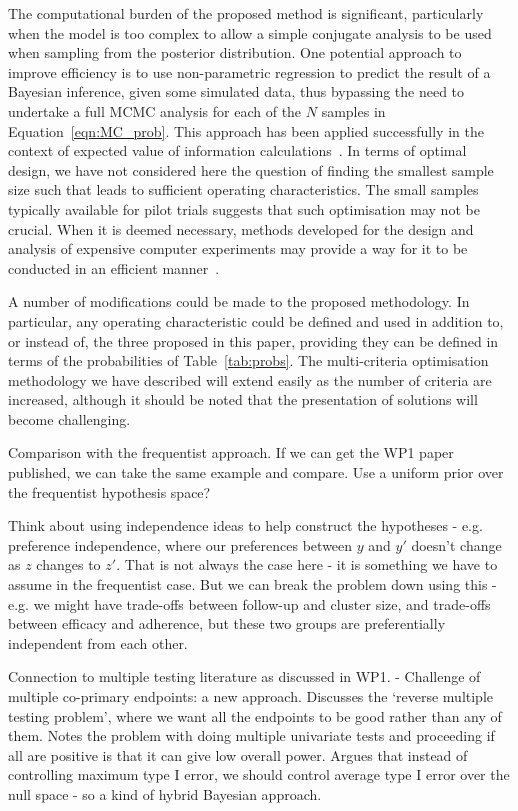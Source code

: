 \documentclass{article} %
\begin{document}
The computational burden of the proposed method is significant, particularly when the model is too complex to allow a simple conjugate analysis to be used when sampling from the posterior distribution. One potential approach to improve efficiency is to use non-parametric regression to predict the result of a Bayesian inference, given some simulated data, thus bypassing the need to undertake a full MCMC analysis for each of the $N$ samples in Equation~\ref{eqn:MC_prob}. This approach has been applied successfully in the context of expected value of information calculations~\cite{Strong2014, Strong2015}. In terms of optimal design, we have not considered here the question of finding the smallest sample size such that leads to sufficient operating characteristics. The small samples typically available for pilot trials suggests that such optimisation may not be crucial. When it is deemed necessary, methods developed for the design and analysis of expensive computer experiments may provide a way for it to be conducted in an efficient manner~\cite{Jones2001}.

A number of modifications could be made to the proposed methodology. In particular, any operating characteristic could be defined and used in addition to, or instead of, the three proposed in this paper, providing they can be defined in terms of the probabilities of Table~\ref{tab:probs}. The multi-criteria optimisation methodology we have described will extend easily as the number of criteria are increased, although it should be noted that the presentation of solutions will become challenging.

Comparison with the frequentist approach. If we can get the WP1 paper published, we can take the same example and compare. Use a uniform prior over the frequentist hypothesis space?

Think about using independence ideas to help construct the hypotheses  - e.g. preference independence, where our preferences between $y$ and $y'$ doesn't change as $z$ changes to $z'$. That is not always the case here - it is something we have to assume in the frequentist case. But we can break the problem down using this - e.g. we might have trade-offs between follow-up and cluster size, and trade-offs between efficacy and adherence, but these two groups are preferentially independent from each other. 

Connection to multiple testing literature as discussed in WP1. \cite{Chuang-Stein2007} - Challenge of multiple co-primary endpoints: a new approach. Discusses the `reverse multiple testing problem', where we want all the endpoints to be good rather than any of them. Notes the problem with doing multiple univariate tests and proceeding if all are positive is that it can give low overall power. Argues that instead of controlling maximum type I error, we should control average type I error over the null space - so a kind of hybrid Bayesian approach. 
\end{document}
